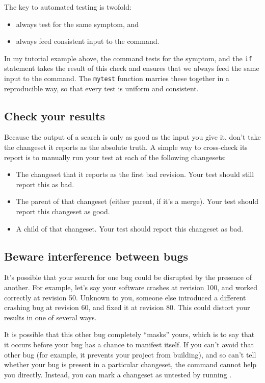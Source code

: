 The key to automated testing is twofold:
\begin{itemize}
\item always test for the same symptom, and
\item always feed consistent input to the  command.
\end{itemize}
In my tutorial example above, the  command tests for the
symptom, and the \texttt{if} statement takes the result of this check
and ensures that we always feed the same input to the 
command.  The \texttt{mytest} function marries these together in a
reproducible way, so that every test is uniform and consistent.

\subsection{Check your results}

Because the output of a  search is only as good as the
input you give it, don't take the changeset it reports as the
absolute truth.  A simple way to cross-check its report is to manually
run your test at each of the following changesets:
\begin{itemize}
\item The changeset that it reports as the first bad revision.  Your
  test should still report this as bad.
\item The parent of that changeset (either parent, if it's a merge).
  Your test should report this changeset as good.
\item A child of that changeset.  Your test should report this
  changeset as bad.
\end{itemize}

\subsection{Beware interference between bugs}

It's possible that your search for one bug could be disrupted by the
presence of another.  For example, let's say your software crashes at
revision 100, and worked correctly at revision 50.  Unknown to you,
someone else introduced a different crashing bug at revision 60, and
fixed it at revision 80.  This could distort your results in one of
several ways.

It is possible that this other bug completely ``masks'' yours, which
is to say that it occurs before your bug has a chance to manifest
itself.  If you can't avoid that other bug (for example, it prevents
your project from building), and so can't tell whether your bug is
present in a particular changeset, the  command cannot
help you directly.  Instead, you can mark a changeset as untested by
running .

